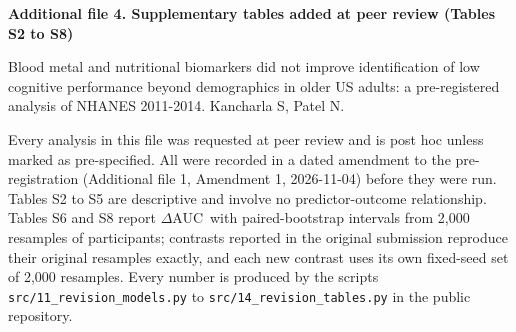 \documentclass[11pt]{article}
\newcommand{\deltaauc}{$\Delta$AUC}
\begin{document}
\begin{center}
{\large\bfseries Additional file 4. Supplementary tables added at peer review (Tables S2 to S8)\par}
\medskip
{\small Blood metal and nutritional biomarkers did not improve identification of low cognitive performance beyond demographics in older US adults: a pre-registered analysis of NHANES 2011-2014. Kancharla S, Patel N.\par}
\end{center}

Every analysis in this file was requested at peer review and is post hoc unless marked as pre-specified. All were recorded in a dated amendment to the pre-registration (Additional file 1, Amendment 1, 2026-11-04) before they were run. Tables S2 to S5 are descriptive and involve no predictor-outcome relationship. Tables S6 and S8 report \deltaauc\ with paired-bootstrap intervals from 2,000 resamples of participants; contrasts reported in the original submission reproduce their original resamples exactly, and each new contrast uses its own fixed-seed set of 2,000 resamples. Every number is produced by the scripts \texttt{src/11\_revision\_models.py} to \texttt{src/14\_revision\_tables.py} in the public repository.

\footnotesize
\end{document}
